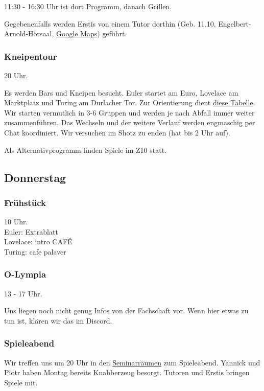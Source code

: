 \documentclass[10pt,ngerman]{scrartcl}
\begin{document}
\begin{multicols}{2}
11:30 - 16:30 Uhr ist dort Programm, danach Grillen.

Gegebenenfalls werden Erstis von einem Tutor dorthin (Geb. 11.10, Engelbert-Arnold-Hörsaal, \href{https://goo.gl/maps/R9WbmtbrKRxdziYY9}{Google Maps}) geführt.


\subsubsection{Kneipentour}

20 Uhr.

Es werden Bars und Kneipen besucht.
Euler startet am Euro, Lovelace am Marktplatz und Turing am Durlacher Tor.
Zur Orientierung dient \href{https://docs.google.com/spreadsheets/d/1Ea5M858ijKzbtYuySIMmbNUEUUtv-4jGpAmmq59vIvc/edit?usp=sharing}{diese Tabelle}.
Wir starten vermutlich in 3-6 Gruppen und werden je nach Abfall immer weiter zusammenführen.
Das Wechseln und der weitere Verlauf werden engmaschig per Chat koordiniert.
Wir versuchen im Shotz zu enden (hat bis 2 Uhr auf).

Als Alternativprogramm finden Spiele im Z10 statt.



\subsection{Donnerstag}

\subsubsection{Frühstück}

10 Uhr. \\
Euler: Extrablatt \\
Lovelace: intro CAFÉ \\
Turing: cafe palaver

\subsubsection{O-Lympia}

13 - 17 Uhr.

Uns liegen noch nicht genug Infos von der Fachschaft vor.
Wenn hier etwas zu tun ist, klären wir das im Discord.

\subsubsection{Spieleabend}

Wir treffen uns um 20 Uhr in den \hyperref[rooms]{Seminarräumen} zum Spieleabend.
Yannick und Piotr haben Montag bereits Knabberzeug besorgt.
Tutoren und Erstis bringen Spiele mit.




\end{multicols}
\end{document}
